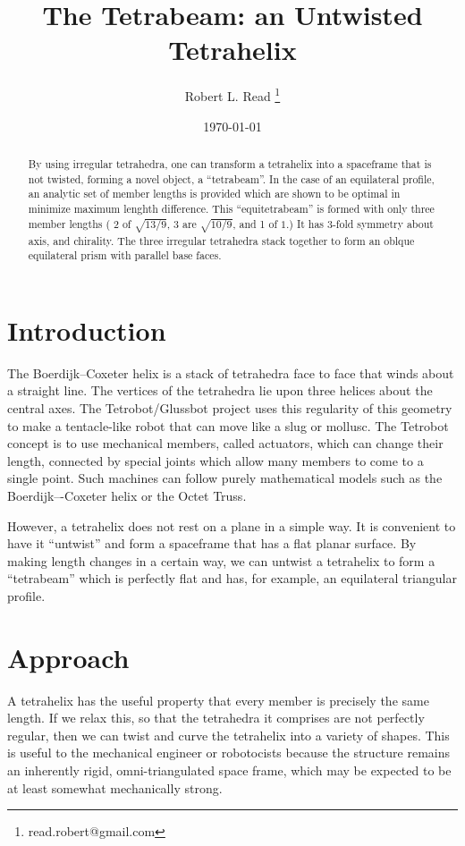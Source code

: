 \documentclass[11pt]{article}
\title{The Tetrabeam: an Untwisted Tetrahelix}
\author{Robert L. Read
  \thanks{read.robert@gmail.com}
}
\affil{Founder, Public Invention, an educational non-profit.}
\date{\today}
\begin{document}
\maketitle


\begin{abstract}
  By using irregular tetrahedra, one can transform a tetrahelix into a spaceframe that is not twisted, forming a novel object, a
  ``tetrabeam''.
  In the case of an equilateral profile, an analytic set of member lengths is provided which are shown to be optimal in minimize
  maximum lenghth difference.
  This ``equitetrabeam'' is formed with only three member lengths ( 2 of $\sqrt{13/9}$, 3 are $\sqrt{10/9}$, and 1 of $1$.) It has 3-fold symmetry about
  axis, and chirality.  The three irregular tetrahedra stack together to form an oblque equilateral prism with parallel base faces. 
\end{abstract}


\section{Introduction}

The Boerdijk--Coxeter helix is a stack of tetrahedra face to face that winds about a straight line. The vertices of the tetrahedra
lie upon three
helices about the central axes. The Tetrobot/Glussbot project
uses this regularity of this geometry to make a tentacle-like robot that can move like a slug or mollusc. The Tetrobot concept
is to use mechanical members, called actuators, which can change their length, connected by special joints which allow many
members to come to a single point. Such machines can follow purely mathematical models such as the Boerdijk–-Coxeter helix or the Octet Truss.

However, a tetrahelix does not rest on a plane in a simple way. It is convenient to have it ``untwist'' and form a spaceframe that
has a flat planar surface. By making length changes in a certain way, we can untwist a tetrahelix to form a ``tetrabeam'' which
is perfectly flat and has, for example, an equilateral triangular profile.

\section{Approach}

A tetrahelix has the useful property that every member is precisely the same length. If we relax this, so that the tetrahedra it
comprises are not perfectly regular, then we can twist and curve the tetrahelix into a variety of shapes. This is useful to
the mechanical engineer or robotocists because the structure remains an inherently rigid, omni-triangulated space frame, which
may be expected to be at least somewhat mechanically strong.
\end{document}
